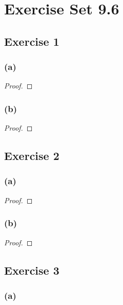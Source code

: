 \documentclass[14pt]{extarticle}
\begin{document}
\section{Exercise Set 9.6}

\subsection{Exercise 1}

\subsubsection{(a)}

\begin{proof}

\end{proof}

\subsubsection{(b)}

\begin{proof}

\end{proof}

\subsection{Exercise 2}

\subsubsection{(a)}

\begin{proof}

\end{proof}

\subsubsection{(b)}

\begin{proof}

\end{proof}

\subsection{Exercise 3}

\subsubsection{(a)}
\end{document}
